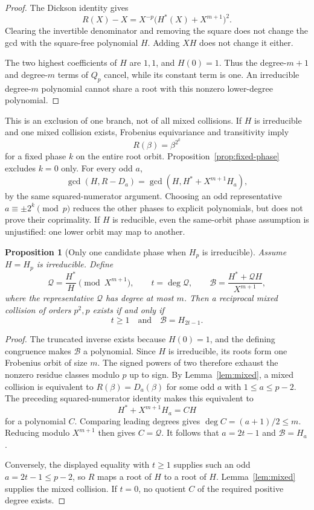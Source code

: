\documentclass[a4paper]{article}
\newtheorem{proposition}[theorem]{Proposition}
\begin{document}
\begin{proof}
The Dickson identity gives
\[
 R(X)-X=X^{-p}\bigl(H^*(X)+X^{m+1}\bigr)^2.
\]
Clearing the invertible denominator and removing the square does not
change the gcd with the square-free polynomial $H$.
Adding $XH$ does not change it either.

The two highest coefficients of $H$ are $1,1$, and $H(0)=1$.
Thus the degree-$m+1$ and degree-$m$ terms of $Q_p$ cancel, while its
constant term is one.
An irreducible degree-$m$ polynomial cannot share a root with this
nonzero lower-degree polynomial.
\end{proof}

This is an exclusion of one branch, not of all mixed collisions.
If $H$ is irreducible and one mixed collision exists, Frobenius
equivariance and transitivity imply
\[
 R(\beta)=\beta^{2^k}
\]
for a fixed phase $k$ on the entire root orbit.
Proposition~\ref{prop:fixed-phase} excludes $k=0$ only.
For every odd $a$,
\[
 \gcd(H,R-D_a)=
 \gcd\!\left(H,H^*+X^{m+1}H_a\right),
\]
by the same squared-numerator argument.
Choosing an odd representative $a\equiv\pm2^k\pmod p$ reduces
the other phases to explicit polynomials, but does not prove their
coprimality.  If $H$ is reducible, even the same-orbit phase
assumption is unjustified: one lower orbit may map to another.

\begin{proposition}[Only one candidate phase when $H_p$ is irreducible]
\label{prop:one-phase}
Assume $H=H_p$ is irreducible.  Define
\[
 \mathcal Q=\frac{H^*}{H}\pmod{X^{m+1}},\qquad
 t=\deg\mathcal Q,\qquad
 \mathcal B=\frac{H^*+\mathcal QH}{X^{m+1}},
\]
where the representative $\mathcal Q$ has degree at most $m$.
Then a reciprocal mixed collision of orders $p^2,p$ exists if and only if
\[
 t\geq1\quad\text{and}\quad
 \mathcal B=H_{2t-1}.
\]
\end{proposition}

\begin{proof}
The truncated inverse exists because $H(0)=1$, and the defining
congruence makes $\mathcal B$ a polynomial.
Since $H$ is irreducible, its roots form one Frobenius orbit of size
$m$.  The signed powers of two therefore exhaust the nonzero residue
classes modulo $p$ up to sign.
By Lemma~\ref{lem:mixed}, a mixed collision is equivalent to
$R(\beta)=D_a(\beta)$ for some odd $a$ with $1\leq a\leq p-2$.
The preceding squared-numerator identity makes this equivalent to
\[
 H^*+X^{m+1}H_a=CH
\]
for a polynomial $C$.
Comparing leading degrees gives $\deg C=(a+1)/2\leq m$.
Reducing modulo $X^{m+1}$ then gives $C=\mathcal Q$.
It follows that $a=2t-1$ and $\mathcal B=H_a$.

Conversely, the displayed equality with $t\geq1$ supplies such an odd
$a=2t-1\leq p-2$, so $R$ maps a root of $H$ to a root of $H$.
Lemma~\ref{lem:mixed} supplies the mixed collision.
If $t=0$, no quotient $C$ of the required positive degree exists.
\end{proof}
\end{document}

